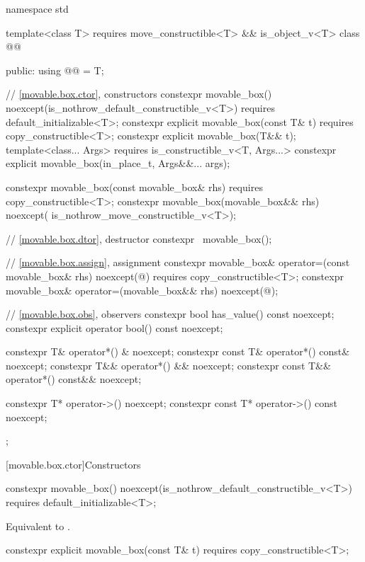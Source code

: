 \begin{codeblock}
namespace std {
  template<class T>
    requires move_constructible<T> && is_object_v<T>
  class @@ {
  public:
    using @@ = T;

    // \ref{movable.box.ctor}, constructors
    constexpr movable_box() noexcept(is_nothrow_default_constructible_v<T>)
      requires default_initializable<T>;
    constexpr explicit movable_box(const T& t)
      requires copy_constructible<T>;
    constexpr explicit movable_box(T&& t);
    template<class... Args>
      requires is_constructible_v<T, Args...>
    constexpr explicit movable_box(in_place_t, Args&&... args);

    constexpr movable_box(const movable_box& rhs)
      requires copy_constructible<T>;
    constexpr movable_box(movable_box&& rhs) noexcept(
        is_nothrow_move_constructible_v<T>);

    // \ref{movable.box.dtor}, destructor
    constexpr ~movable_box();

    // \ref{movable.box.assign}, assignment
    constexpr movable_box& operator=(const movable_box& rhs) noexcept(@\seebelow@)
      requires copy_constructible<T>;
    constexpr movable_box& operator=(movable_box&& rhs) noexcept(@\seebelow@);

    // \ref{movable.box.obs}, observers
    constexpr bool has_value() const noexcept;
    constexpr explicit operator bool() const noexcept;

    constexpr T& operator*() & noexcept;
    constexpr const T& operator*() const& noexcept;
    constexpr T&& operator*() && noexcept;
    constexpr const T&& operator*() const&& noexcept;

    constexpr T* operator->() noexcept;
    constexpr const T* operator->() const noexcept;
  };
}
\end{codeblock}

[movable.box.ctor]{Constructors}

%
\begin{itemdecl}
constexpr movable_box() noexcept(is_nothrow_default_constructible_v<T>)
  requires default_initializable<T>;
\end{itemdecl}

\begin{itemdescr}
\pnum
\effects
Equivalent to .
\end{itemdescr}

%
\begin{itemdecl}
constexpr explicit movable_box(const T& t)
  requires copy_constructible<T>;
\end{itemdecl}

